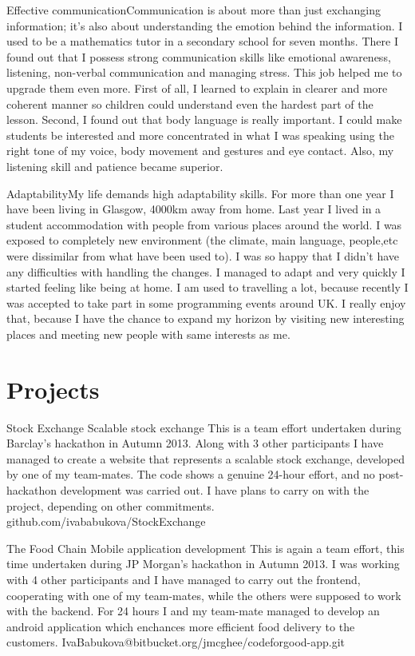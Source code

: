 \documentclass{tccv}
\begin{document}
\begin{skillist}
\item{Effective communication}{Communication is about more than just exchanging information; it's also about understanding the emotion behind the information. I used to be a mathematics tutor in a secondary school for seven months. There I found out that I possess strong communication skills like emotional awareness, listening, non-verbal communication and managing stress. This job helped me to upgrade them even more. First of all, I learned to explain in clearer and more coherent manner so children could understand even the hardest part of the lesson. Second, I found out that body language is really important. I could make students be interested and more concentrated in what I was speaking using the right tone of my voice, body movement and gestures and eye contact. Also, my listening skill and patience became superior.} 
\item{Adaptability}{My life demands high adaptability skills. For more than one year I have been living in Glasgow, 4000km away from home. Last year I lived in a student accommodation with people from various places around the world. I was exposed to completely new environment (the climate, main language, people,etc were dissimilar from what have been used to). I was so happy that I didn't have any difficulties with handling the changes. I managed to adapt and very quickly I started feeling like being at home. I am used to travelling a lot, because recently I was accepted to take part in some programming events around UK. I really enjoy that, because I have the chance to expand my horizon by visiting new interesting places and meeting new people with same interests as me.}
\end{skillist}

\section{Projects}


\begin{eventlist}
\item{Stock Exchange}
     {Scalable stock exchange}
     {This is a team effort undertaken during Barclay's hackathon in Autumn 2013. Along with 3 other participants I have managed to create a website that represents a scalable stock exchange, developed by one of my team-mates. The code shows a genuine 24-hour effort, and no post-hackathon development was carried out. I have plans to carry on with the project, depending on other commitments.}
     {github.com/ivababukova/StockExchange}
\item{The Food Chain}
     {Mobile application development}
     {This is again a team effort, this time undertaken during JP Morgan's hackathon in Autumn 2013. I was working with 4 other participants and I have managed to carry out the frontend, cooperating with one of my team-mates, while the others were supposed to work with the backend. For 24 hours I and my team-mate managed to develop an android application which enchances more efficient food delivery to the customers.}
    {IvaBabukova@bitbucket.org/jmcghee/codeforgood-app.git}
\end{eventlist}
\end{document}
